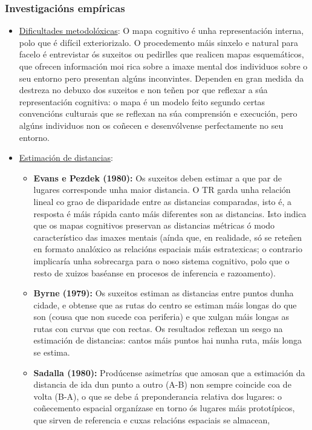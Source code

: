 \documentclass[a4paper,11pt]{article}
\begin{document}
\subsubsection{Investigacións empíricas}
\begin{itemize}
	\item \underline{Dificultades metodolóxicas}: O mapa cognitivo é unha representación interna, 
	polo que é difícil exteriorizalo. O procedemento máis sinxelo e natural para facelo é 
	entrevistar ós suxeitos ou pedirlles que realicen mapas esquemáticos, que ofrecen información 
	moi rica sobre a imaxe mental dos individuos sobre o seu entorno pero presentan algúns 
	inconvintes. Dependen en gran medida da destreza no debuxo dos suxeitos e non teñen por que 
	reflexar a súa representación cognitiva: o mapa é un modelo feito segundo certas convencións 
	culturais que se reflexan na súa comprensión e execución, pero algúns individuos non os coñecen 
	e desenvólvense perfectamente no seu entorno.
	\item \underline{Estimación de distancias}: 
	\begin{itemize}
		\item \textbf{Evans e Pezdek (1980):} Os suxeitos deben estimar a que par de lugares 
		corresponde unha maior distancia. O TR garda unha relación lineal co grao de disparidade 
		entre as distancias comparadas, isto é, a resposta é máis rápida canto máis diferentes son 
		as distancias. Isto indica que os mapas cognitivos preservan as distancias métricas ó modo 
		característico das imaxes mentais (aínda que, en realidade, só se reteñen en formato 
		analóxico as relacións espaciais máis estratexicas; o contrario implicaría unha sobrecarga 
		para o noso sistema cognitivo, polo que o resto de xuizos baséanse en procesos de inferencia 
		e razoamento).
		\item \textbf{Byrne (1979):} Os suxeitos estiman as distancias entre puntos dunha cidade, e 
		obtense que as rutas do centro se estiman máis longas do que son (cousa que non sucede coa 
		periferia) e que xulgan máis longas as rutas con curvas que con rectas. Os resultados 
		reflexan un sesgo na estimación de distancias: cantos máis puntos hai nunha ruta, máis longa 
		se estima.  
		\item \textbf{Sadalla (1980):} Prodúcense asimetrías que amosan que a estimación da 
		distancia de ida dun punto a outro (A-B) non sempre coincide coa de volta (B-A), o que se 
		debe á preponderancia relativa dos lugares: o coñecemento espacial organízase en torno ós 
		lugares máis prototípicos, que sirven de referencia e cuxas relacións espaciais se almacean, 

\end{itemize}
\end{itemize}
\end{document}
